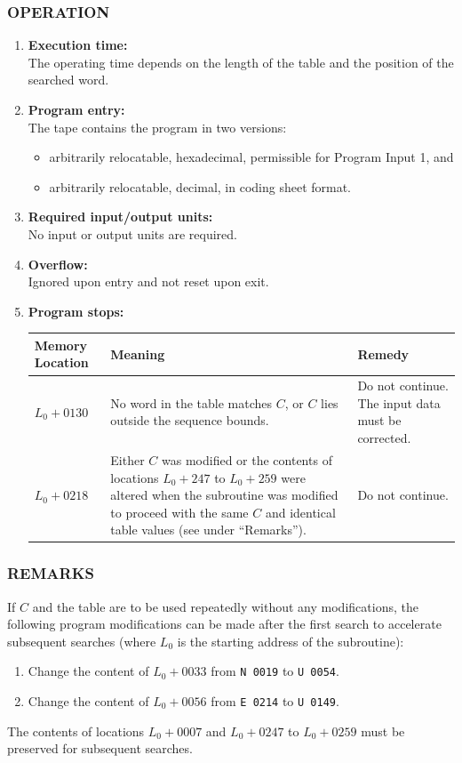 \subsubsection*{OPERATION}
\begin{enumerate}
    \item \textbf{Execution time:} \\
    The operating time depends on the length of the table and the position of the searched word.
    \item \textbf{Program entry:} \\
    The tape contains the program in two versions:
    \begin{itemize}
        \item[a)] arbitrarily relocatable, hexadecimal, permissible for Program Input 1, and
        \item[b)] arbitrarily relocatable, decimal, in coding sheet format.
    \end{itemize}
    \item \textbf{Required input/output units:} \\
    No input or output units are required.
    \item \textbf{Overflow:} \\
    Ignored upon entry and not reset upon exit.
    \item \textbf{Program stops:}
    \begin{table}[h!]
    \centering
    \begin{tabular}{l p{4.5cm} p{4.5cm}}
    \toprule
    \textbf{Memory Location} & \textbf{Meaning} & \textbf{Remedy} \\
    \midrule
    $L_0 + 0130$ & No word in the table matches $C$, or $C$ lies outside the sequence bounds. & Do not continue. The input data must be corrected. \\
    \midrule
    $L_0 + 0218$ & Either $C$ was modified or the contents of locations $L_0 + 247$ to $L_0 + 259$ were altered when the subroutine was modified to proceed with the same $C$ and identical table values (see under ``Remarks''). & Do not continue. \\
    \bottomrule
    \end{tabular}
    \end{table}
\end{enumerate}

\subsubsection*{REMARKS}
If $C$ and the table are to be used repeatedly without any modifications, the following program modifications can be made after the first search to accelerate subsequent searches (where $L_0$ is the starting address of the subroutine):
\begin{enumerate}
    \item Change the content of $L_0 + 0033$ from \texttt{N 0019} to \texttt{U 0054}.
    \item Change the content of $L_0 + 0056$ from \texttt{E 0214} to \texttt{U 0149}.
\end{enumerate}
The contents of locations $L_0 + 0007$ and $L_0 + 0247$ to $L_0 + 0259$ must be preserved for subsequent searches.
\newpage
